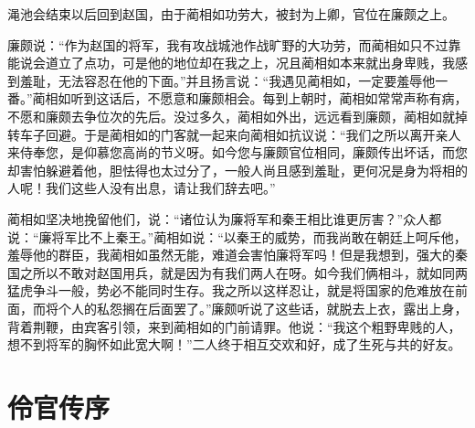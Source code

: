 \documentclass[12pt,UTF-8,openany,a4]{ctexbook}
\begin{document}
\begin{large}
    渑池会结束以后回到赵国，由于蔺相如功劳大，被封为上卿，官位在廉颇之上。
    
    廉颇说：“作为赵国的将军，我有攻战城池作战旷野的大功劳，而蔺相如只不过靠能说会道立了点功，可是他的地位却在我之上，况且蔺相如本来就出身卑贱，我感到羞耻，无法容忍在他的下面。”并且扬言说：“我遇见蔺相如，一定要羞辱他一番。”蔺相如听到这话后，不愿意和廉颇相会。每到上朝时，蔺相如常常声称有病，不愿和廉颇去争位次的先后。没过多久，蔺相如外出，远远看到廉颇，蔺相如就掉转车子回避。于是蔺相如的门客就一起来向蔺相如抗议说：“我们之所以离开亲人来侍奉您，是仰慕您高尚的节义呀。如今您与廉颇官位相同，廉颇传出坏话，而您却害怕躲避着他，胆怯得也太过分了，一般人尚且感到羞耻，更何况是身为将相的人呢！我们这些人没有出息，请让我们辞去吧。”
    
    蔺相如坚决地挽留他们，说：“诸位认为廉将军和秦王相比谁更厉害？”众人都说：“廉将军比不上秦王。”蔺相如说：“以秦王的威势，而我尚敢在朝廷上呵斥他，羞辱他的群臣，我蔺相如虽然无能，难道会害怕廉将军吗！但是我想到，强大的秦国之所以不敢对赵国用兵，就是因为有我们两人在呀。如今我们俩相斗，就如同两猛虎争斗一般，势必不能同时生存。我之所以这样忍让，就是将国家的危难放在前面，而将个人的私怨搁在后面罢了。”廉颇听说了这些话，就脱去上衣，露出上身，背着荆鞭，由宾客引领，来到蔺相如的门前请罪。他说：“我这个粗野卑贱的人，想不到将军的胸怀如此宽大啊！”二人终于相互交欢和好，成了生死与共的好友。
    
\end{large}



\chapter{伶官传序}
\end{document}

